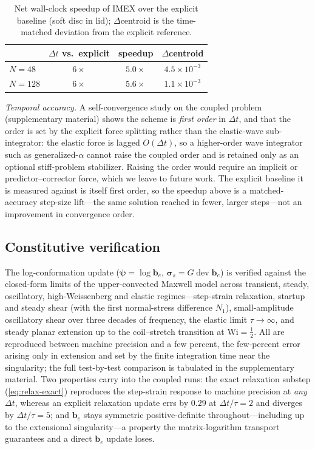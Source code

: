 \documentclass[final,3p,times]{elsarticle}
\theoremstyle{remark}
\newcommand{\be}{\bm{b}_e}              %
\newcommand{\sig}{\bm{\sigma}}          %
\newcommand{\psib}{\bm{\psi}}           %
\newcommand{\dt}{\Delta t}
\newcommand{\dev}{\operatorname{dev}}
\begin{document}
\begin{table}[t]\centering\small
\caption{Net wall-clock speedup of IMEX over the explicit baseline (soft disc in lid);
$\Delta$centroid is the time-matched deviation from the explicit reference.}
\label{tab:speedup}
\begin{tabular}{@{}lccc@{}}
\toprule
 & $\dt$ vs.\ explicit & speedup & $\Delta$centroid \\
\midrule
$N{=}48$  & $6\times$ & $5.0\times$          & $4.5\times10^{-3}$ \\
$N{=}128$ & $6\times$ & $\mathbf{5.6\times}$ & $1.1\times10^{-3}$ \\
\bottomrule
\end{tabular}
\end{table}

\emph{Temporal accuracy.} A self-convergence study on the coupled problem (supplementary material)
shows the scheme is \emph{first order} in $\dt$, and that the order is set by the explicit force
splitting rather than the elastic-wave sub-integrator: the elastic force is lagged $O(\dt)$, so a
higher-order wave integrator such as generalized-$\alpha$ cannot raise the coupled order and is
retained only as an optional stiff-problem stabilizer. Raising the order would require an implicit
or predictor--corrector force, which we leave to future work. The explicit baseline it is measured
against is itself first order, so the speedup above is a matched-accuracy step-size lift---the
same solution reached in fewer, larger steps---not an improvement in convergence order.


\subsection{Constitutive verification}
\label{sec:ve-fsi}
The log-conformation update ($\psib=\log\be$, $\sig_{\!s}=G\dev\be$) is verified against the
closed-form limits of the upper-convected Maxwell model across transient, steady, oscillatory,
high-Weissenberg and elastic regimes---step-strain relaxation, startup and steady shear (with the
first normal-stress difference $N_1$), small-amplitude oscillatory shear over three decades of
frequency, the elastic limit $\tau\to\infty$, and steady planar extension up to the coil--stretch
transition at $\mathrm{Wi}=\tfrac12$. All are reproduced between machine precision and a few
percent, the few-percent error arising only in extension and set by the finite integration time
near the singularity; the full test-by-test comparison is tabulated in the supplementary material.
Two properties carry into the coupled runs: the exact relaxation substep (\cref{eq:relax-exact})
reproduces the step-strain response to machine precision at \emph{any} $\dt$, whereas an explicit
relaxation update errs by $0.29$ at $\dt/\tau=2$ and diverges by $\dt/\tau=5$; and $\be$ stays
symmetric positive-definite throughout---including up to the extensional singularity---a property
the matrix-logarithm transport guarantees and a direct $\be$ update loses.
\end{document}
